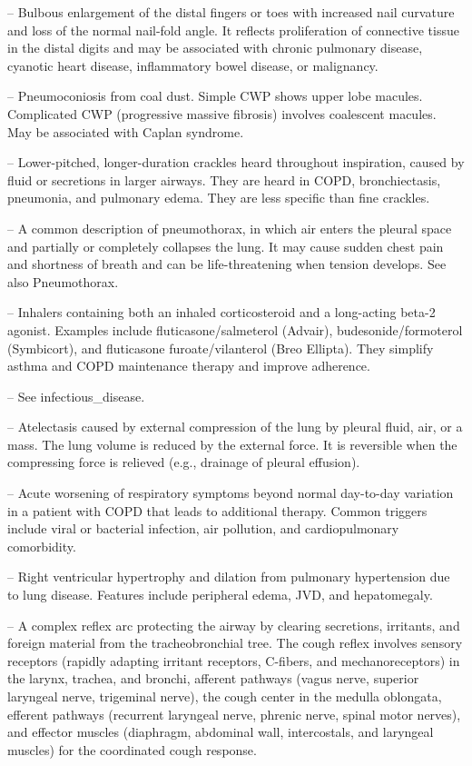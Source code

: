 -- Bulbous enlargement of the distal fingers or toes with increased nail curvature and loss of the normal nail-fold angle. It reflects proliferation of connective tissue in the distal digits and may be associated with chronic pulmonary disease, cyanotic heart disease, inflammatory bowel disease, or malignancy.

-- Pneumoconiosis from coal dust. Simple CWP shows upper lobe macules. Complicated CWP (progressive massive fibrosis) involves coalescent macules. May be associated with Caplan syndrome.

-- Lower-pitched, longer-duration crackles heard throughout inspiration, caused by fluid or secretions in larger airways. They are heard in COPD, bronchiectasis, pneumonia, and pulmonary edema. They are less specific than fine crackles.

-- A common description of pneumothorax, in which air enters the pleural space and partially or completely collapses the lung. It may cause sudden chest pain and shortness of breath and can be life-threatening when tension develops. See also Pneumothorax.

-- Inhalers containing both an inhaled corticosteroid and a long-acting beta-2 agonist. Examples include fluticasone/salmeterol (Advair), budesonide/formoterol (Symbicort), and fluticasone furoate/vilanterol (Breo Ellipta). They simplify asthma and COPD maintenance therapy and improve adherence.

-- See infectious\_disease.

-- Atelectasis caused by external compression of the lung by pleural fluid, air, or a mass. The lung volume is reduced by the external force. It is reversible when the compressing force is relieved (e.g., drainage of pleural effusion).

-- Acute worsening of respiratory symptoms beyond normal day-to-day variation in a patient with COPD that leads to additional therapy. Common triggers include viral or bacterial infection, air pollution, and cardiopulmonary comorbidity.

-- Right ventricular hypertrophy and dilation from pulmonary hypertension due to lung disease. Features include peripheral edema, JVD, and hepatomegaly.

-- A complex reflex arc protecting the airway by clearing secretions, irritants, and foreign material from the tracheobronchial tree. The cough reflex involves sensory receptors (rapidly adapting irritant receptors, C-fibers, and mechanoreceptors) in the larynx, trachea, and bronchi, afferent pathways (vagus nerve, superior laryngeal nerve, trigeminal nerve), the cough center in the medulla oblongata, efferent pathways (recurrent laryngeal nerve, phrenic nerve, spinal motor nerves), and effector muscles (diaphragm, abdominal wall, intercostals, and laryngeal muscles) for the coordinated cough response.

